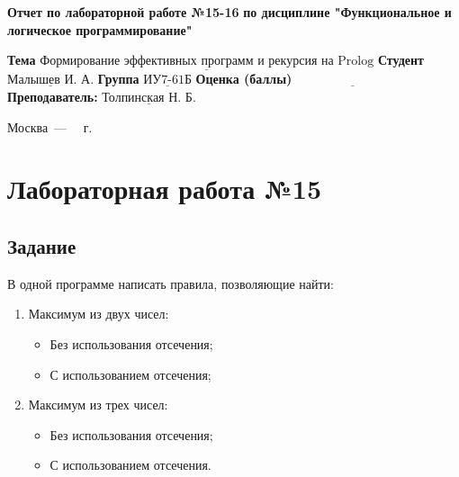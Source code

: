 \documentclass[12pt]{report}
\begin{document}
\begin{titlepage}
		
		\begin{center}
			\noindent\begin{minipage}{1.3\textwidth}\centering
				\Large\textbf{  Отчет по лабораторной работе №15-16}\newline
				\textbf{по дисциплине \newline "Функциональное и логическое программирование"}\newline\newline
			\end{minipage}
		\end{center}
		
		\noindent\textbf{Тема} $\underline{\text{Формирование эффективных программ и рекурсия на Prolog}}$\newline\newline
		\noindent\textbf{Студент} $\underline{\text{Малышев И. А.}}$\newline\newline
		\noindent\textbf{Группа} $\underline{\text{ИУ7-61Б}}$\newline\newline
		\noindent\textbf{Оценка (баллы)} $\underline{\text{~~~~~~~~~~~~~~~~~~~~~~~~~~~}}$\newline\newline
		\noindent\textbf{Преподаватель: } $\underline{\text{Толпинская Н. Б.}}$\newline\newline\newline
		
		\begin{center}
			\vfill
			Москва~---~\the\year
			~г.
		\end{center}
	\end{titlepage}
	
	
	\setcounter{page}{2}

\chapter*{Лабораторная работа №15}
\section*{Задание}

В одной программе написать правила, позволяющие найти:

\begin{enumerate}
	\item Максимум из двух чисел:
	\begin{itemize}
		\item Без использования отсечения;
		\item С использованием отсечения;
	\end{itemize}
	\item Максимум из трех чисел:
	\begin{itemize}
		\item Без использования отсечения;
		\item С использованием отсечения.
	\end{itemize}
\end{enumerate}
\end{document}
